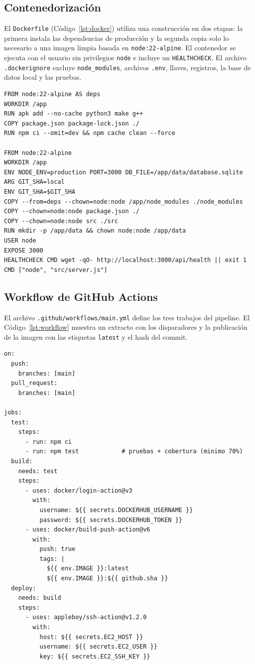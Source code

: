 \documentclass[12pt,letterpaper]{article}
\begin{document}
\subsection{Contenedorización}

El \texttt{Dockerfile} (Código~\ref{lst:docker}) utiliza una construcción en dos etapas: la primera instala las dependencias de producción y la segunda copia solo lo necesario a una imagen limpia basada en \texttt{node:22-alpine}. El contenedor se ejecuta con el usuario sin privilegios \texttt{node} e incluye un \texttt{HEALTHCHECK}. El archivo \texttt{.dockerignore} excluye \texttt{node\_modules}, archivos \texttt{.env}, llaves, registros, la base de datos local y las pruebas.

\begin{lstlisting}[caption={Dockerfile de dos etapas.}, label={lst:docker}]
FROM node:22-alpine AS deps
WORKDIR /app
RUN apk add --no-cache python3 make g++
COPY package.json package-lock.json ./
RUN npm ci --omit=dev && npm cache clean --force

FROM node:22-alpine
WORKDIR /app
ENV NODE_ENV=production PORT=3000 DB_FILE=/app/data/database.sqlite
ARG GIT_SHA=local
ENV GIT_SHA=$GIT_SHA
COPY --from=deps --chown=node:node /app/node_modules ./node_modules
COPY --chown=node:node package.json ./
COPY --chown=node:node src ./src
RUN mkdir -p /app/data && chown node:node /app/data
USER node
EXPOSE 3000
HEALTHCHECK CMD wget -qO- http://localhost:3000/api/health || exit 1
CMD ["node", "src/server.js"]
\end{lstlisting}

\subsection{Workflow de GitHub Actions}

El archivo \texttt{.github/workflows/main.yml} define los tres trabajos del pipeline. El Código~\ref{lst:workflow} muestra un extracto con los disparadores y la publicación de la imagen con las etiquetas \texttt{latest} y el hash del commit.

\begin{lstlisting}[caption={Extracto de \texttt{.github/workflows/main.yml}.}, label={lst:workflow}]
on:
  push:
    branches: [main]
  pull_request:
    branches: [main]

jobs:
  test:
    steps:
      - run: npm ci
      - run: npm test            # pruebas + cobertura (minimo 70%)
  build:
    needs: test
    steps:
      - uses: docker/login-action@v3
        with:
          username: ${{ secrets.DOCKERHUB_USERNAME }}
          password: ${{ secrets.DOCKERHUB_TOKEN }}
      - uses: docker/build-push-action@v6
        with:
          push: true
          tags: |
            ${{ env.IMAGE }}:latest
            ${{ env.IMAGE }}:${{ github.sha }}
  deploy:
    needs: build
    steps:
      - uses: appleboy/ssh-action@v1.2.0
        with:
          host: ${{ secrets.EC2_HOST }}
          username: ${{ secrets.EC2_USER }}
          key: ${{ secrets.EC2_SSH_KEY }}
\end{lstlisting}
\end{document}
